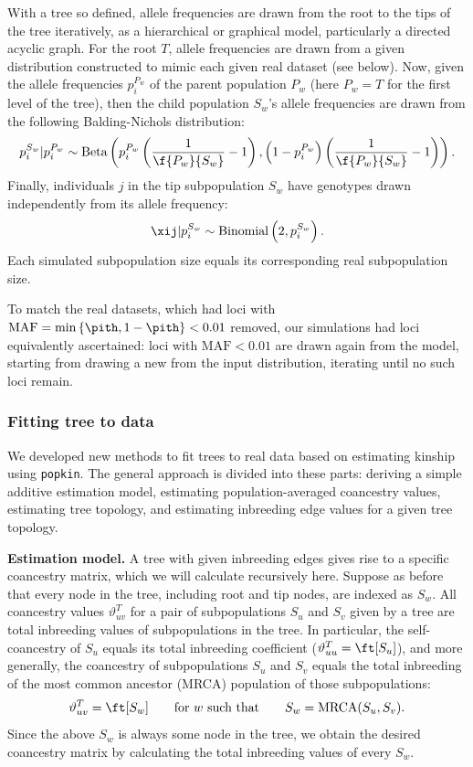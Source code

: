 \documentclass[11pt]{article}
\begin{document}
With a tree so defined, allele frequencies are drawn from the root to the tips of the tree iteratively, as a hierarchical or graphical model, particularly a directed acyclic graph.
For the root $T$, allele frequencies \pit are drawn from a given distribution constructed to mimic each given real dataset (see below).
Now, given the allele frequencies $p_i^{P_w}$ of the parent population $P_w$ (here $P_w = T$ for the first level of the tree), then the child population $S_w$'s allele frequencies are drawn from the following Balding-Nichols distribution:
$$
p_i^{S_w} | p_i^{P_w}
\sim
\text{Beta} \left(
  p_i^{P_w} \left( \frac{1}{ \f{P_w}{S_w} } - 1 \right),
  \left( 1 - p_i^{P_w} \right) \left( \frac{1}{ \f{P_w}{S_w} } - 1 \right)
\right)
.
$$
Finally, individuals $j$ in the tip subpopulation $S_w$ have genotypes drawn independently from its allele frequency:
$$
\xij | p_i^{S_w}
\sim
\text{Binomial}\left( 2, p_i^{S_w} \right)
.
$$
Each simulated subpopulation size equals its corresponding real subpopulation size.

To match the real datasets, which had loci with $\text{MAF} = \min \left\{ \pith, 1 - \pith \right\} < 0.01$ removed, our simulations had loci equivalently ascertained:
loci with $\text{MAF} < 0.01$ are drawn again from the model, starting from drawing a new \pit from the input distribution, iterating until no such loci remain.

\subsubsection{Fitting tree to data}

We developed new methods to fit trees to real data based on estimating kinship using \texttt{popkin}.
The general approach is divided into these parts:
deriving a simple additive estimation model,
estimating population-averaged coancestry values,
estimating tree topology, and
estimating inbreeding edge values for a given tree topology.

\textbf{Estimation model.}
A tree with given inbreeding edges gives rise to a specific coancestry matrix, which we will calculate recursively here.
Suppose as before that every node in the tree, including root and tip nodes, are indexed as $S_w$.
All coancestry values $\vartheta_{uv}^T$ for a pair of subpopulations $S_u$ and $S_v$ given by a tree are total inbreeding values of subpopulations in the tree.
In particular, the self-coancestry of $S_u$ equals its total inbreeding coefficient ($\vartheta_{uu}^T = \ft[S_u]$), and more generally, the coancestry of subpopulations $S_u$ and $S_v$ equals the total inbreeding of the most common ancestor (MRCA) population of those subpopulations:
$$
\vartheta_{uv}^T
=
\ft[ S_w ]
\quad\quad
\text{for~} w \text{~such that}
\quad\quad
S_w = \text{MRCA}( S_u, S_v )
.
$$
Since the above $S_w$ is always some node in the tree, we obtain the desired coancestry matrix by calculating the total inbreeding values of every $S_w$.
\end{document}
